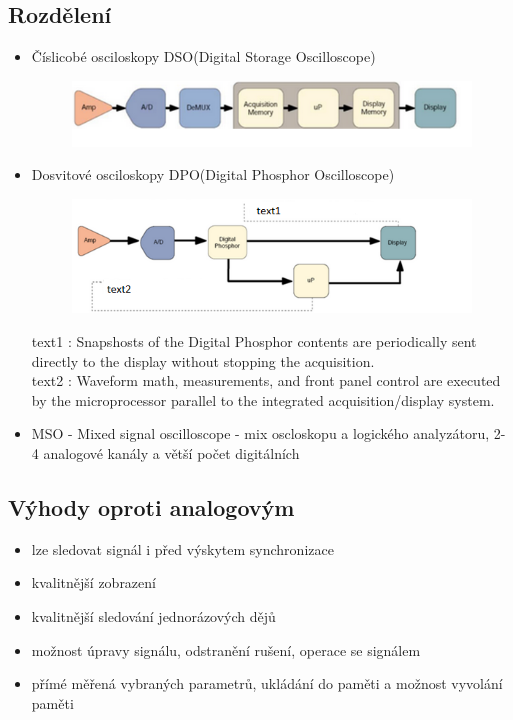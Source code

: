 \subsection*{Rozdělení}
\begin{itemize}
    \item Číslicobé osciloskopy DSO(Digital Storage Oscilloscope)
    \begin{figure}[H]
        \includegraphics*[scale = 1]{images/osciloskopSchemaDSO.png}
    \end{figure}
    \item Dosvitové osciloskopy DPO(Digital Phosphor Oscilloscope)
    \begin{figure}[H]
        \includegraphics*[scale = 1]{images/osciloskopSchemaDPO.png}
    \end{figure}
    text1 : Snapshosts of the Digital Phosphor contents are periodically sent directly to the display without stopping the acquisition.\\
    text2 : Waveform math, measurements, and front panel control are executed by the microprocessor parallel to the integrated acquisition/display system.\\
    \item MSO - Mixed signal oscilloscope - mix oscloskopu a logického analyzátoru, 2-4 analogové kanály a větší počet digitálních 
\end{itemize}

\subsection*{Výhody oproti analogovým}
\begin{itemize}
    \item lze sledovat signál i před výskytem synchronizace
    \item kvalitnější zobrazení
    \item kvalitnější sledování jednorázových dějů
    \item možnost úpravy signálu, odstranění rušení, operace se signálem
    \item přímé měřená vybraných parametrů, ukládání do paměti a možnost vyvolání paměti
\end{itemize}

